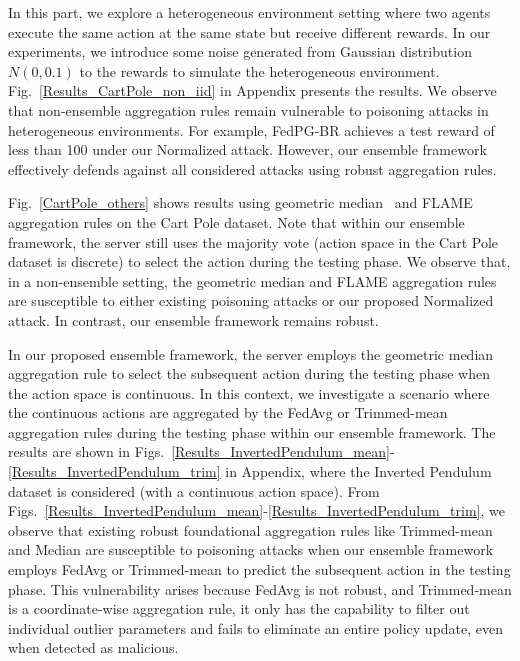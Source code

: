 %
%
%
In this part, we explore a heterogeneous environment setting where two agents execute the same action at the same state but receive different rewards. In our experiments, we introduce some noise generated from Gaussian distribution $N(0,0.1)$ to the rewards to simulate the heterogeneous environment.
%
Fig.~\ref{Results_CartPole_non_iid} in Appendix presents the results. We observe that non-ensemble aggregation rules remain vulnerable to poisoning attacks in heterogeneous environments. For example, FedPG-BR achieves a test reward of less than 100 under our Normalized attack. However, our ensemble framework effectively defends against all considered attacks using robust aggregation rules.





%
%
Fig.~\ref{CartPole_others} shows results using geometric median~\cite{ChenPOMACS17} and FLAME~\cite{nguyen2022flame} aggregation rules on the Cart Pole dataset. 
Note that within our ensemble framework, the server still uses the majority vote (action space in the Cart Pole dataset is discrete) to select the action during the testing phase.
%
We observe that, in a non-ensemble setting, the geometric median and FLAME aggregation rules are susceptible to either existing poisoning attacks or our proposed Normalized attack. In contrast, our ensemble framework remains robust.





In our proposed ensemble framework, the server employs the geometric median aggregation rule to select the subsequent action during the testing phase when the action space is continuous. In this context, we investigate a scenario where the continuous actions are aggregated by the FedAvg or Trimmed-mean aggregation rules during the testing phase within our ensemble framework.
The results are shown in Figs.~\ref{Results_InvertedPendulum_mean}-\ref{Results_InvertedPendulum_trim} in Appendix, where the Inverted Pendulum dataset is considered (with a continuous action space).
%
From Figs.~\ref{Results_InvertedPendulum_mean}-\ref{Results_InvertedPendulum_trim}, we observe that existing robust foundational aggregation rules like Trimmed-mean and Median are susceptible to poisoning attacks when our ensemble framework employs FedAvg or Trimmed-mean to predict the subsequent action in the testing phase. This vulnerability arises because FedAvg is not robust, and Trimmed-mean is a coordinate-wise aggregation rule, it only has the capability to filter out individual outlier parameters and fails to eliminate an entire policy update, even when detected as malicious.
%
%















